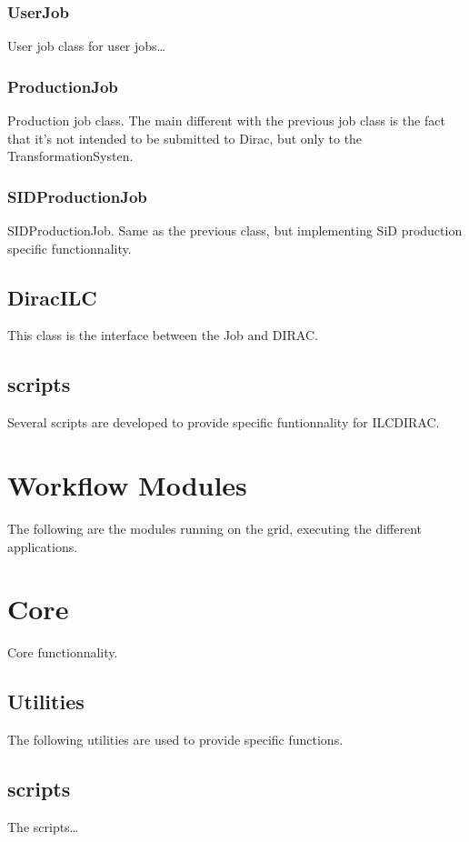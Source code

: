 \documentclass[a4paper,12pt]{article}
\begin{document}
\subsubsection{UserJob}\label{userjob}
User job class for user jobs\ldots

\subsubsection{ProductionJob}\label{prodjob}
Production job class. The main different with the previous job class is the fact
that it's not intended to be submitted to Dirac, but only to the
TransformationSysten.

\subsubsection{SIDProductionJob}\label{sidprod}
SIDProductionJob. Same as the previous class, but implementing SiD production
specific functionnality.

\subsection{DiracILC}\label{diracilc}
This class is the interface between the Job and DIRAC.

\subsection{scripts}\label{interfacescripts}
Several scripts are developed to provide specific funtionnality for ILCDIRAC.

\section{Workflow Modules}\label{modules}
The following are the modules running on the grid, executing the different
applications.

\section{Core}\label{core}
Core functionnality.
\subsection{Utilities}\label{coreutilities}
The following utilities are used to provide specific functions.
\subsection{scripts}\label{corescripts}
The scripts\ldots
\end{document}
